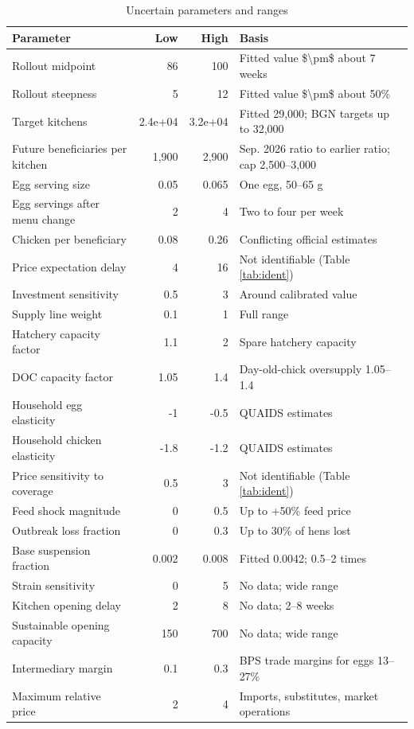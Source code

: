\documentclass[10pt,twocolumn,a4paper]{article}
\begin{document}
\begin{table}[!htb]
\centering
\scriptsize
\caption{Uncertain parameters and ranges}\label{tab:unc}
\begin{tabularx}{\linewidth}{>{\raggedright\arraybackslash}p{2.6cm}rr>{\raggedright\arraybackslash}X}
\toprule
\textbf{Parameter} & \textbf{Low} & \textbf{High} & \textbf{Basis} \\
\midrule
Rollout midpoint & 86 & 100 & Fitted value \$\textbackslash{}pm\$ about 7 weeks \\
Rollout steepness & 5 & 12 & Fitted value \$\textbackslash{}pm\$ about 50\% \\
Target kitchens & 2.4e+04 & 3.2e+04 & Fitted 29,000; BGN targets up to 32,000 \\
Future beneficiaries per kitchen & 1,900 & 2,900 & Sep. 2026 ratio to earlier ratio; cap 2,500--3,000 ~\cite{cap2025} \\
Egg serving size & 0.05 & 0.065 & One egg, 50--65 g \\
Egg servings after menu change & 2 & 4 & Two to four per week ~\cite{egg3x2026} \\
Chicken per beneficiary & 0.08 & 0.26 & Conflicting official estimates ~\cite{gopan2025} \\
Price expectation delay & 4 & 16 & Not identifiable (Table \ref{tab:ident}) \\
Investment sensitivity & 0.5 & 3 & Around calibrated value \\
Supply line weight & 0.1 & 1 & Full range ~\cite{sterman2000} \\
Hatchery capacity factor & 1.1 & 2 & Spare hatchery capacity \\
DOC capacity factor & 1.05 & 1.4 & Day-old-chick oversupply 1.05--1.4 \\
Household egg elasticity & -1 & -0.5 & QUAIDS estimates ~\cite{khoiriyah2024} \\
Household chicken elasticity & -1.8 & -1.2 & QUAIDS estimates ~\cite{khoiriyah2024} \\
Price sensitivity to coverage & 0.5 & 3 & Not identifiable (Table \ref{tab:ident}) \\
Feed shock magnitude & 0 & 0.5 & Up to +50\% feed price \\
Outbreak loss fraction & 0 & 0.3 & Up to 30\% of hens lost \\
Base suspension fraction & 0.002 & 0.008 & Fitted 0.0042; 0.5--2 times \\
Strain sensitivity & 0 & 5 & No data; wide range \\
Kitchen opening delay & 2 & 8 & No data; 2--8 weeks \\
Sustainable opening capacity & 150 & 700 & No data; wide range \\
Intermediary margin & 0.1 & 0.3 & BPS trade margins for eggs 13--27\% \\
Maximum relative price & 2 & 4 & Imports, substitutes, market operations \\
\bottomrule
\end{tabularx}
\end{table}
\end{document}
